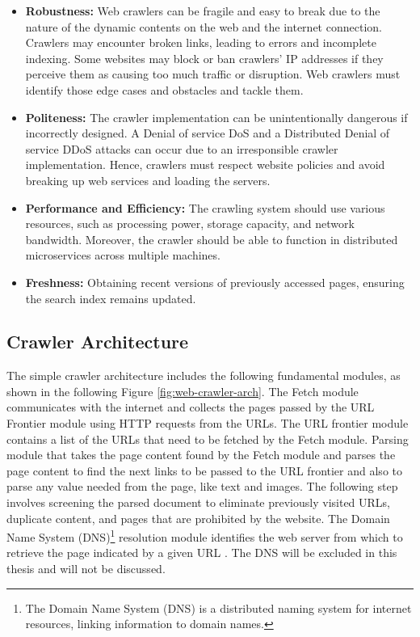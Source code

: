 \begin{itemize}
\item[] \textbf{Robustness:} Web crawlers can be fragile and easy to break due to the nature of the dynamic contents on the web and the internet connection. Crawlers may encounter broken links, leading to errors and incomplete indexing. Some websites may block or ban crawlers' IP addresses if they perceive them as causing too much traffic or disruption. Web crawlers must identify those edge cases and obstacles and tackle them.

\item[] \textbf{Politeness:} The crawler implementation can be unintentionally dangerous if incorrectly designed. A Denial of service DoS and a Distributed Denial of service DDoS attacks can occur due to an irresponsible crawler implementation. Hence, crawlers must respect website policies and avoid breaking up web services and loading the servers.

\item[] \textbf{Performance and Efficiency:} The crawling system should use various resources, such as processing power, storage capacity, and network bandwidth. Moreover, the crawler should be able to function in distributed microservices across multiple machines.

\item[] \textbf{Freshness:} Obtaining recent versions of previously accessed pages, ensuring the search index remains updated.
\end{itemize}

\subsection{Crawler Architecture}

The simple crawler architecture includes the following fundamental modules, as shown in the following Figure \ref{fig:web-crawler-arch}. The Fetch module communicates with the internet and collects the pages passed by the URL Frontier module using HTTP requests from the URLs. The URL frontier module contains a list of the URLs that need to be fetched by the Fetch module. Parsing module that takes the page content found by the Fetch module and parses the page content to find the next links to be passed to the URL frontier and also to parse any value needed from the page, like text and images. The following step involves screening the parsed document to eliminate previously visited URLs, duplicate content, and pages that are prohibited by the website. The Domain Name System (DNS)\footnote{The Domain Name System (DNS) is a distributed naming system for internet resources, linking information to domain names.} resolution module identifies the web server from which to retrieve the page indicated by a given URL \cite{manning2008}. The DNS will be excluded in this thesis and will not be discussed. 


